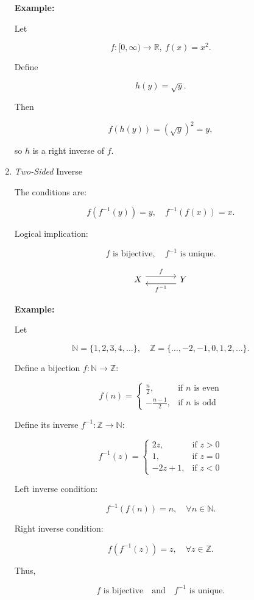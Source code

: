 \documentclass[12pt,a4paper,openany]{article}
\begin{document}
\begin{enumerate}
    \textbf{Example:}

    Let

    \[
    f: [0, \infty) \to \mathbb{R}, \
    f(x) = x^2.
    \]

    Define

    \[
    h(y) = \sqrt{y}.
    \]

    Then

    \[
    f(h(y)) = (\sqrt{y})^2 = y,
    \]

    so $h$ is a right inverse of $f$.

\item \textit{Two-Sided} Inverse

    The conditions are:

    \[
    f(f^{-1}(y)) = y, \quad f^{-1}(f(x)) = x.
    \]

    Logical implication:

    \[
    f \text{ is bijective}, \quad f^{-1} \text{ is unique}.
    \]

    \[
    \begin{tikzcd}[row sep=large, column sep=large]
    X \arrow[r, shift left=1ex, "f"]
    & Y \arrow[l, shift left=1ex, "f^{-1}"]
    \end{tikzcd}
    \]

    \newpage
    \textbf{Example:}

    Let

    \[
    \mathbb{N} = \{1,2,3,4,\ldots\}, 
    \quad
    \mathbb{Z} = \{\ldots,-2,-1,0,1,2,\ldots\}.
    \]

    Define a bijection $f : \mathbb{N} \to \mathbb{Z}$:

    \[
    f(n) = 
    \begin{cases}
    \displaystyle\frac{n}{2}, & \text{if } n \text{ is even} \\[6pt]
    -\displaystyle\frac{n-1}{2}, & \text{if } n \text{ is odd}
    \end{cases}
    \]

    Define its inverse $f^{-1} : \mathbb{Z} \to \mathbb{N}$:

    \[
    f^{-1}(z) = 
    \begin{cases}
    2z, & \text{if } z > 0 \\[6pt]
    1, & \text{if } z = 0 \\[6pt]
    -2z + 1, & \text{if } z < 0
    \end{cases}
    \]

    Left inverse condition:

    \[
    f^{-1}(f(n)) = n, \quad \forall n \in \mathbb{N}.
    \]

    Right inverse condition:

    \[
    f(f^{-1}(z)) = z, \quad \forall z \in \mathbb{Z}.
    \]

    Thus,

    \[
    f \text{ is bijective} \quad \text{and} \quad f^{-1} \text{ is unique}.
    \]

\end{enumerate}
\end{document}
